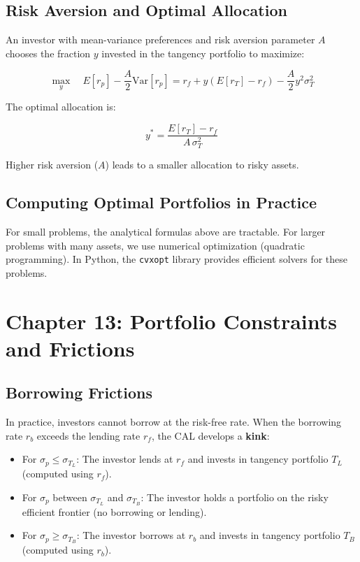 \documentclass[11pt,letterpaper]{report}
\begin{document}
\section{Risk Aversion and Optimal Allocation}


An investor with mean-variance preferences and risk aversion parameter $A$ chooses the fraction $y$ invested in the tangency portfolio to maximize:

$$\max_y \quad E[r_p] - \frac{A}{2} \text{Var}[r_p] = r_f + y(E[r_T] - r_f) - \frac{A}{2} y^2 \sigma_T^2$$

The optimal allocation is:

$$y^* = \frac{E[r_T] - r_f}{A \, \sigma_T^2}$$

Higher risk aversion ($A$) leads to a smaller allocation to risky assets.

\section{Computing Optimal Portfolios in Practice}


For small problems, the analytical formulas above are tractable.  For larger problems with many assets, we use numerical optimization (quadratic programming).  In Python, the \texttt{cvxopt} library provides efficient solvers for these problems.


\chapter{Chapter 13: Portfolio Constraints and Frictions}


\section{Borrowing Frictions}


In practice, investors cannot borrow at the risk-free rate.  When the borrowing rate $r_b$ exceeds the lending rate $r_f$, the CAL develops a \textbf{kink}:

\begin{itemize}
  \item For $\sigma_p \leq \sigma_{T_L}$: The investor lends at $r_f$ and invests in tangency portfolio $T_L$ (computed using $r_f$).
  \item For $\sigma_p$ between $\sigma_{T_L}$ and $\sigma_{T_B}$: The investor holds a portfolio on the risky efficient frontier (no borrowing or lending).
  \item For $\sigma_p \geq \sigma_{T_B}$: The investor borrows at $r_b$ and invests in tangency portfolio $T_B$ (computed using $r_b$).
\end{itemize}
\end{document}
